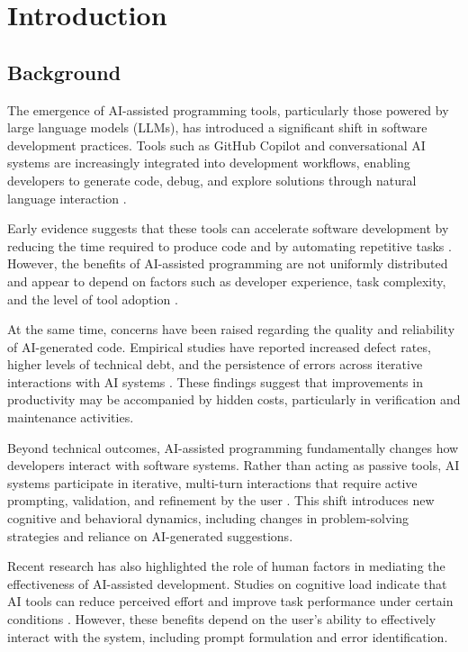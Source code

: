 \documentclass[conference]{IEEEtran}
\begin{document}
\section{Introduction}

\subsection{Background}

The emergence of AI-assisted programming tools, particularly those powered by large language models (LLMs), has introduced a significant shift in software development practices. Tools such as GitHub Copilot and conversational AI systems are increasingly integrated into development workflows, enabling developers to generate code, debug, and explore solutions through natural language interaction \cite{cui_productivity_2024, rasnayaka_empirical_2024}.

Early evidence suggests that these tools can accelerate software development by reducing the time required to produce code and by automating repetitive tasks \cite{kumar_intuition_2025, kumar_intuition_2025}. However, the benefits of AI-assisted programming are not uniformly distributed and appear to depend on factors such as developer experience, task complexity, and the level of tool adoption \cite{xu_ai-assisted_2026, koripalli_copilot_2025}.

At the same time, concerns have been raised regarding the quality and reliability of AI-generated code. Empirical studies have reported increased defect rates, higher levels of technical debt, and the persistence of errors across iterative interactions with AI systems \cite{sandoval_lost_2022, zhong_developer-llm_2025}. These findings suggest that improvements in productivity may be accompanied by hidden costs, particularly in verification and maintenance activities.

Beyond technical outcomes, AI-assisted programming fundamentally changes how developers interact with software systems. Rather than acting as passive tools, AI systems participate in iterative, multi-turn interactions that require active prompting, validation, and refinement by the user \cite{zhong_developer-llm_2025, pinto_developer_2024}. This shift introduces new cognitive and behavioral dynamics, including changes in problem-solving strategies and reliance on AI-generated suggestions.

Recent research has also highlighted the role of human factors in mediating the effectiveness of AI-assisted development. Studies on cognitive load indicate that AI tools can reduce perceived effort and improve task performance under certain conditions \cite{brachten_ability_2020}. However, these benefits depend on the user's ability to effectively interact with the system, including prompt formulation and error identification.
\end{document}
